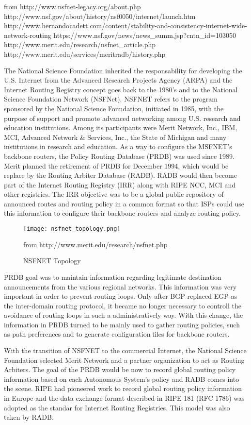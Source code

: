 \documentclass[11pt]{report}
\begin{document}
from http://www.nsfnet-legacy.org/about.php
http://www.nsf.gov/about/history/nsf0050/internet/launch.htm
http://www.hernandocadett.com/content/stability-and-consistency-internet-wide-network-routing
https://www.nsf.gov/news/news\_summ.jsp?cntn\_id=103050
http://www.merit.edu/research/nsfnet\_article.php
http://www.merit.edu/services/meritradb/history.php

The National Science Foundation inherited the responsability for developing the U.S. Internet from the Advanced Research Projects Agency (ARPA) and the Internet Routing Registry concept goes back to the 1980's and to the National Science Foundation Network (NSFNet).  NSFNET refers to the program sponsored by the National Science Foundation, initiated in 1985, with the purpose of support and promote advanced networking among U.S. research and education institutions. Among its participants were Merit Network, Inc., IBM, MCI, Advanced Network \& Services, Inc., the State of Michigan and many institutions in research and education. As a way to configure the MSFNET's backbone routers, the Policy Routing Database (PRDB) was used since 1989. Merit planned the retirement of PRDB for December 1994, which would be replace by the Routing Arbiter Database (RADB). RADB would then become part of the Internet Routing Registry (IRR) along with RIPE NCC, MCI and other registries. The IRR objective was to be a global public repository of announced routes and routing policy in a common format so that ISPs could use this information to configure their backbone routers and analyze routing policy.

\begin{figure}[h!]
\centering
\texttt{[image: nsfnet\_topology.png]}
\caption{NSFNET Topology}
from http://www.merit.edu/research/nsfnet.php
\label{fig:nfsnet_image}
\end{figure}

PRDB goal was to maintain information regarding legitimate destination announcements from the various regional networks. This information was very important in order to prevent routing loops. Only after BGP replaced EGP as the inter-domain routing protocol, it became no longer necessary to controll the avoidance of routing loops in such a administratively way. With this change, the information in PRDB turned to be mainly used to gather routing policies, such as path preferences and to generate configuration files for backbone routers.

With the transition of NSFNET to the commercial Internet, the National Science Foundation selected Merit Network and a partner organization to act as Routing Arbiters. The goal of the PRDB would be now to record global routing policy information based on each Autonomous System's policy and RADB comes into the scene. RIPE had pioneered work to record global routing policy information in Europe and the data exchange format described in RIPE-181 (RFC 1786) was adopted as the standar for Internet Routing Registries. This model was also taken by RADB. 
\end{document}
